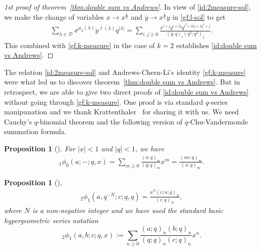 \documentclass[11pt,reqno]{amsart}
\numberwithin{equation}{section}
\theoremstyle{plain}
\newtheorem{proposition}[theorem]{Proposition}
\theoremstyle{definition}
\theoremstyle{named}
\newcommand{\abs}[1]{\left|#1\right|}
\def\cD{\mathcal{D}}
\def\la{\lambda}
\begin{document}
\begin{proof}[1st proof of theorem~\ref{thm:double sum vs Andrews}]
In view of \eqref{id:2measure-sol}, we make the change of variables $x\to x^{\frac{1}{2}}$ and $y\to x^{\frac{1}{2}}y$ in \eqref{gf:l-sol} to get
\begin{align}\label{id:2-measure-pos}
\sum_{\la\in\cD}x^{\mu_2(\la)}y^{\ell(\la)}q^{\abs{\la}}=\sum_{i,j\ge 0}\frac{x^{i+j}y^{i+2j}q^{i^2+2ij+2j^2+j}}{(q;q)_i(q^2;q^2)_j}.
\end{align}
This combined with \eqref{gf:k-measure} in the case of $k=2$ establishes \eqref{id:double sum vs Andrews}.
\end{proof}

The relation \eqref{id:2measure-sol} and Andrews-Chern-Li's identity \eqref{gf:k-measure} were what led us to discover theorem~\ref{thm:double sum vs Andrews}. But in retrospect, we are able to give two direct proofs of \eqref{id:double sum vs Andrews} without going through \eqref{gf:k-measure}. One proof is via standard $q$-series manipunation and we thank Krattenthaler~\cite{kra24} for sharing it with us. We need Cauchy's $q$-binomial theorem and the following version of $q$-Chu-Vandermonde summation formula.
\begin{proposition}[{\cite[Eq.~(1.3.2); Appendix (II.3)]{GR90}}]
For $\abs{x}<1$ and $\abs{q}<1$, we have
\begin{align}\label{id:qbinom}
_{1}\phi_{0}(a; -; q, x)=\sum_{m\geq 0}\frac{(a; q)_{m}}{(q; q)_{m}}x^m=\frac{(ax; q)_{\infty}}{(x; q)_{\infty}}.
\end{align}
\end{proposition}
\begin{proposition}[{\cite[Eq.~(1.5.3); Appendix (II.6)]{GR90}}]
\begin{align}\label{id:qChuVan}
_{2}\phi_{1}(a, q^{-N}; c; q, q)=\frac{a^N(c/a; q)_{N}}{(c; q)_{N}},
\end{align}
where $N$ is a non-negative integer and we have used the standard basic hypergeometric series notation
$$_2\phi_1(a,b;c;q,x):=\sum_{n\ge 0}\frac{(a;q)_n(b;q)_n}{(q;q)_n(c;q)_n}x^n.$$
\end{proposition}
\end{document}
